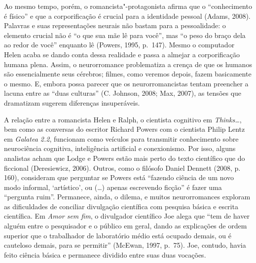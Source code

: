 Ao mesmo tempo, porém, o romancista"-protagonista afirma que o
``conhecimento é físico'' e que a corporificação é crucial para a
identidade pessoal (Adams, 2008). Palavras e suas representações neurais
não bastam para a pessoalidade: o elemento crucial não é ``o que sua mãe
lê para você'', mas ``o peso do braço dela ao redor de você'' enquanto
lê (Powers, 1995, p.~147). Mesmo o computador Helen acaba se dando conta
dessa realidade e passa a almejar a corporificação humana plena. Assim,
o neurorromance problematiza a crença de que os humanos são
essencialmente seus cérebros; filmes, como veremos depois, fazem
basicamente o mesmo. E, embora possa parecer que os neurorromancistas
tentam preencher a lacuna entre as ``duas culturas'' (C. Johnson, 2008;
Max, 2007), as tensões que dramatizam sugerem diferenças insuperáveis.

A relação entre a romancista Helen e Ralph, o cientista cognitivo em
\emph{Thinks\ldots{}}, bem como as conversas do escritor Richard Powers com o
cientista Philip Lentz em \emph{Galatea 2.2}, funcionam como veículos
para transmitir conhecimento sobre neurociência cognitiva, inteligência
artificial e conexionismo. Por isso, alguns analistas acham que Lodge e
Powers estão mais perto do texto científico que do ficcional
(Deresiewicz, 2006). Outros, como o filósofo Daniel Dennett (2008, p.
160), consideram que perguntar se Powers está ``fazendo ciência de um
novo modo informal, `artístico', ou (\ldots{}) apenas escrevendo ficção'' é
fazer uma ``pergunta ruim''. Permanece, ainda, o dilema, e muitos
neurorromances exploram as dificuldades de conciliar divulgação
científica com pesquisa básica e escrita científica. Em \emph{Amor sem
fim}, o divulgador científico Joe alega que ``tem de haver alguém entre
o pesquisador e o público em geral, dando as explicações de ordem
superior que o trabalhador de laboratório médio está ocupado demais, ou
é cauteloso demais, para se permitir'' (McEwan, 1997, p.~75). Joe,
contudo, havia feito ciência básica e permanece dividido entre suas duas
vocações.


